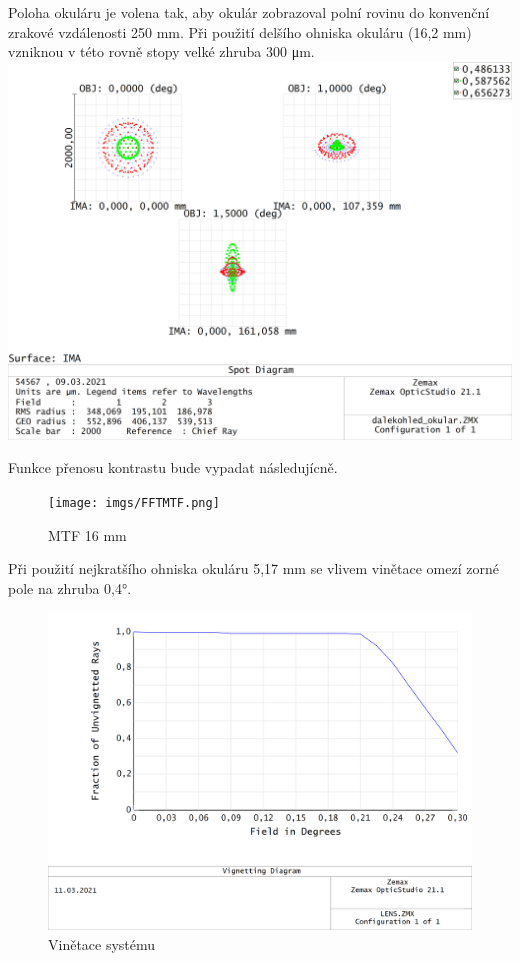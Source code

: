 \documentclass[
]{article}
\begin{document}
Poloha okuláru je volena tak, aby okulár zobrazoval polní rovinu do
konvenční zrakové vzdálenosti 250 mm. Při použití delšího ohniska
okuláru (16,2 mm) vzniknou v této rovně stopy velké zhruba 300 μm.
\includegraphics{imgs/SpotDiagram_oko_16mm.png}

Funkce přenosu kontrastu bude vypadat následujícně.

\begin{figure}
\centering
\texttt{[image: imgs/FFTMTF.png]}
\caption{MTF 16 mm}
\end{figure}

Při použití nejkratšího ohniska okuláru 5,17 mm se vlivem vinětace omezí
zorné pole na zhruba 0,4°.

\begin{figure}
\centering
\includegraphics{imgs/VignettingDiagram_5mm.png}
\caption{Vinětace systému}
\end{figure}
\end{document}
